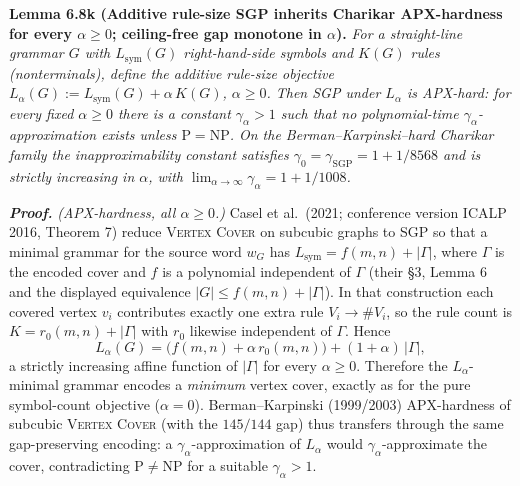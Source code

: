 \documentclass[
]{article}
\begin{document}
\textbf{Lemma 6.8k (Additive rule-size SGP inherits Charikar
APX-hardness for every $\alpha \geq 0$; ceiling-free gap monotone in
$\alpha$).} \emph{For a straight-line grammar $G$ with $L_{\mathrm{sym}}(G)$
right-hand-side symbols and $K(G)$ rules (nonterminals), define the
additive rule-size objective $L_\alpha(G) := L_{\mathrm{sym}}(G) +
\alpha\,K(G)$, $\alpha \geq 0$. Then SGP under $L_\alpha$ is APX-hard:
for every fixed $\alpha \geq 0$ there is a constant
$\gamma_\alpha > 1$ such that no polynomial-time
$\gamma_\alpha$-approximation exists unless $\mathrm{P} = \mathrm{NP}$.
On the Berman--Karpinski--hard Charikar family the inapproximability
constant satisfies $\gamma_0 = \gamma_{\mathrm{SGP}} = 1 + 1/8568$ and is
strictly increasing in $\alpha$, with
$\lim_{\alpha \to \infty} \gamma_\alpha = 1 + 1/1008$.}

\emph{\textbf{Proof.}} \emph{(APX-hardness, all $\alpha \geq 0$.)} Casel
et al.\ (2021; conference version ICALP 2016, Theorem 7) reduce
\textsc{Vertex Cover} on subcubic graphs to SGP so that a minimal
grammar for the source word $w_G$ has $L_{\mathrm{sym}} = f(m,n) +
|\Gamma|$, where $\Gamma$ is the encoded cover and $f$ is a polynomial
independent of $\Gamma$ (their \S3, Lemma 6 and the displayed
equivalence $|G| \leq f(m,n) + |\Gamma|$). In that construction each
covered vertex $v_i$ contributes exactly one extra rule
$V_i \to \#V_i$, so the rule count is $K = r_0(m,n) + |\Gamma|$ with
$r_0$ likewise independent of $\Gamma$. Hence
\[
L_\alpha(G) = \bigl(f(m,n) + \alpha\,r_0(m,n)\bigr) + (1+\alpha)\,|\Gamma|,
\]
a strictly increasing affine function of $|\Gamma|$ for every
$\alpha \geq 0$. Therefore the $L_\alpha$-minimal grammar encodes a
\emph{minimum} vertex cover, exactly as for the pure symbol-count
objective ($\alpha = 0$). Berman--Karpinski (1999/2003) APX-hardness of
subcubic \textsc{Vertex Cover} (with the $145/144$ gap) thus transfers
through the same gap-preserving encoding: a $\gamma_\alpha$-approximation
of $L_\alpha$ would $\gamma_\alpha$-approximate the cover, contradicting
$\mathrm{P} \neq \mathrm{NP}$ for a suitable $\gamma_\alpha > 1$.
\end{document}
